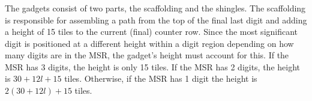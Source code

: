 \subsubsection{\roofunit}
    The {\roofunit} gadgets consist of two parts, the scaffolding and the shingles.
    The scaffolding is responsible for assembling a path from the top of the final last digit and adding a height of 15 tiles to the current (final) counter row.
    Since the most significant digit is positioned at a different height within a digit region depending on how many digits
    are in the MSR, the {\roofscaffolding} gadget's height must account for this.
    If the MSR has 3 digits, the height is only 15 tiles.
    If the MSR has 2 digits, the height is $30 + 12l + 15$ tiles.
    Otherwise, if the MSR has 1 digit the height is $2 (30 + 12l) + 15$ tiles.




